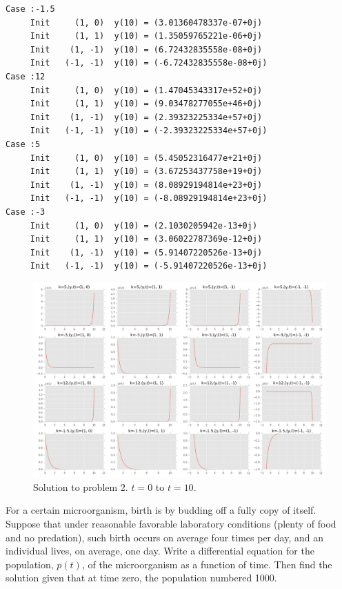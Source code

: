 \begin{questions}
\begin{solution}
\begin{verbatim}
Case :-1.5
	 Init     (1, 0)  y(10) = (3.01360478337e-07+0j)
	 Init     (1, 1)  y(10) = (1.35059765221e-06+0j)
	 Init    (1, -1)  y(10) = (6.72432835558e-08+0j)
	 Init   (-1, -1)  y(10) = (-6.72432835558e-08+0j)
Case :12
	 Init     (1, 0)  y(10) = (1.47045343317e+52+0j)
	 Init     (1, 1)  y(10) = (9.03478277055e+46+0j)
	 Init    (1, -1)  y(10) = (2.39323225334e+57+0j)
	 Init   (-1, -1)  y(10) = (-2.39323225334e+57+0j)
Case :5
	 Init     (1, 0)  y(10) = (5.45052316477e+21+0j)
	 Init     (1, 1)  y(10) = (3.67253437758e+19+0j)
	 Init    (1, -1)  y(10) = (8.08929194814e+23+0j)
	 Init   (-1, -1)  y(10) = (-8.08929194814e+23+0j)
Case :-3
	 Init     (1, 0)  y(10) = (2.1030205942e-13+0j)
	 Init     (1, 1)  y(10) = (3.06022787369e-12+0j)
	 Init    (1, -1)  y(10) = (5.91407220526e-13+0j)
	 Init   (-1, -1)  y(10) = (-5.91407220526e-13+0j)
\end{verbatim}

\end{solution}

\begin{figure}[h!]
    \includegraphics[width=\textwidth]{./problem2_solution.png}
    \caption{Solution to problem 2. $t = 0$ to $t = 10$. }
    \label{fig:problem2}
\end{figure}



\question[5]
\label{prob3}

For a certain microorganism, birth is by budding off a fully copy of itself.
Suppose that under reasonable favorable laboratory conditions (plenty of food
and no predation), such birth occurs on average four times per day, and an
individual lives, on average, one day. Write a differential equation for the
population, $p(t)$, of the microorganism as a function of time. Then find the
solution given that at time zero, the population numbered 1000.




\end{questions}
